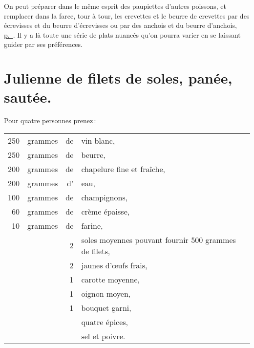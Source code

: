 \sk

On peut préparer dans le même esprit des paupiettes d'autres poissons, et
remplacer dans la farce, tour à tour, les crevettes et le beurre de crevettes
par des écrevisses et du beurre d’écrevisses ou par des anchois et du beurre
d'anchois, \hyperlink{p0337}{p. \pageref{pg0337}}. Il y a là toute une série de plats
nuancés qu'on pourra varier en se laissant guider par ses préférences.

\section*{\centering Julienne de filets de soles, panée, sautée.}

Pour quatre personnes prenez :

\medskip

\footnotesize
\begin{longtable}{rrrp{16em}}
    250 & grammes & de & vin blanc,                                                                       \\
    250 & grammes & de & beurre,                                                                          \\
    200 & grammes & de & chapelure fine et fraîche,                                                       \\
    200 & grammes & d' & eau,                                                                             \\
    100 & grammes & de & champignons,                                                                     \\
     60 & grammes & de & crème épaisse,                                                                   \\
     10 & grammes & de & farine,                                                                          \\
        &         &  2 & soles moyennes pouvant fournir 500 grammes de filets,                            \\
        &         &  2 & jaunes d'œufs frais,                                                             \\
        &         &  1 & carotte moyenne,                                                                 \\
        &         &  1 & oignon moyen,                                                                    \\
        &         &  1 & bouquet garni,                                                                   \\
        &         &    & quatre épices,                                                                   \\
        &         &    & sel et poivre.                                                                   \\
\end{longtable}
\normalsize

